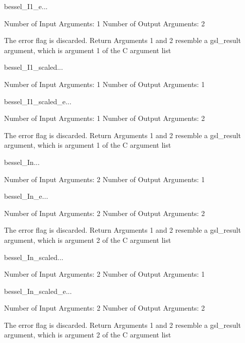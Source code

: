 \begin{funcdesc}{bessel_I1_e}{...}

    Number of Input  Arguments:  1
    Number of Output Arguments:  2

The error flag is discarded.
Return Arguments 1 and 2 resemble a gsl_result argument,
	which is  argument 1 of the C argument list

\end{funcdesc}

\begin{funcdesc}{bessel_I1_scaled}{...}

    Number of Input  Arguments:  1
    Number of Output Arguments:  1
\end{funcdesc}

\begin{funcdesc}{bessel_I1_scaled_e}{...}

    Number of Input  Arguments:  1
    Number of Output Arguments:  2

The error flag is discarded.
Return Arguments 1 and 2 resemble a gsl_result argument,
	which is  argument 1 of the C argument list

\end{funcdesc}

\begin{funcdesc}{bessel_In}{...}

    Number of Input  Arguments:  2
    Number of Output Arguments:  1
\end{funcdesc}

\begin{funcdesc}{bessel_In_e}{...}

    Number of Input  Arguments:  2
    Number of Output Arguments:  2

The error flag is discarded.
Return Arguments 1 and 2 resemble a gsl_result argument,
	which is  argument 2 of the C argument list

\end{funcdesc}

\begin{funcdesc}{bessel_In_scaled}{...}

    Number of Input  Arguments:  2
    Number of Output Arguments:  1
\end{funcdesc}

\begin{funcdesc}{bessel_In_scaled_e}{...}

    Number of Input  Arguments:  2
    Number of Output Arguments:  2

The error flag is discarded.
Return Arguments 1 and 2 resemble a gsl_result argument,
	which is  argument 2 of the C argument list

\end{funcdesc}

